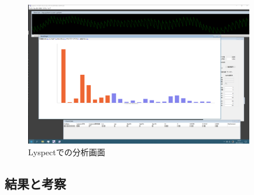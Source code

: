 \begin{figure}[htbp]
  \begin{minipage}{\hsize}
    \begin{center}
       \includegraphics[width=100mm]{img/lyspect.png}
    \end{center}
    \caption{Lyspectでの分析画面}
    \label{fig:lyspect}
  \end{minipage}
\end{figure}


\subsection{結果と考察}